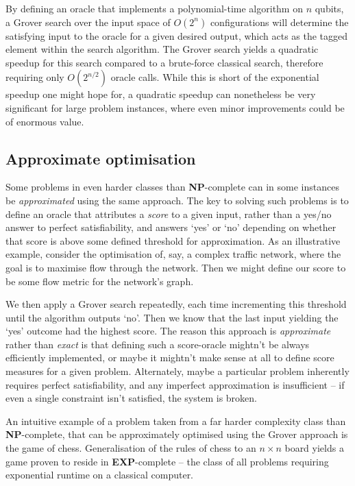 By defining an oracle that implements a polynomial-time algorithm on $n$ qubits, a Grover search over the input space of $O(2^n)$ configurations will determine the satisfying input to the oracle for a given desired output, which acts as the tagged element within the search algorithm. The Grover search yields a quadratic speedup for this search compared to a brute-force classical search, therefore requiring only $O(2^{n/2})$ oracle calls. While this is short of the exponential speedup one might hope for, a quadratic speedup can nonetheless be very significant for large problem instances, where even minor improvements could be of enormous value.

\subsection{Approximate optimisation}

Some problems in even harder classes than \textbf{NP}-complete can in some instances be \textit{approximated} using the same approach. The key to solving such problems is to define an oracle that attributes a \textit{score} to a given input, rather than a yes/no answer to perfect satisfiability, and answers `yes' or `no' depending on whether that score is above some defined threshold for approximation. As an illustrative example, consider the optimisation of, say, a complex traffic network, where the goal is to maximise flow through the network. Then we might define our score to be some flow metric for the network's graph.

We then apply a Grover search repeatedly, each time incrementing this threshold until the algorithm outputs `no'. Then we know that the last input yielding the `yes' outcome had the highest score. The reason this approach is \textit{approximate} rather than \textit{exact} is that defining such a score-oracle mightn't be always efficiently implemented, or maybe it mightn't make sense at all to define score measures for a given problem. Alternately, maybe a particular problem inherently requires perfect satisfiability, and any imperfect approximation is insufficient -- if even a single constraint isn't satisfied, the system is broken.

An intuitive example of a problem taken from a far harder complexity class than \textbf{NP}-complete, that can be approximately optimised using the Grover approach is the game of chess. Generalisation of the rules of chess to an \mbox{$n\times n$} board yields a game proven to reside in \textbf{EXP}-complete -- the class of all problems requiring exponential runtime on a classical computer.

